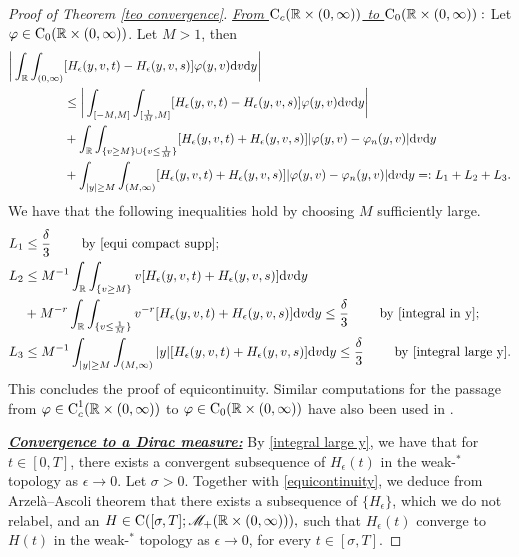 \documentclass[11pt]{article}
\numberwithin{equation}{section}
\newcommand{\der}{\textup{d}}
\begin{document}
\begin{proof}[Proof of Theorem \ref{teo convergence}]
\textit{\underline{From $\textup{C}_{c}(\mathbb{R}\times(0,\infty))$ to  $\textup{C}_{0}(\mathbb{R}\times(0,\infty)):$}} 
Let $\varphi\in\textup{C}_{0}(\mathbb{R}\times(0,\infty))$. Let $M>1$, then 
\begin{align*}
    \bigg|\int_{\mathbb{R}}\int_{(0,\infty)} & [H_{\epsilon}(y,v,t)-H_{\epsilon}(y,v,s)]\varphi(y,v)\der v \der y\bigg|\\
    &\leq \bigg|\int_{[-M,M]}\int_{[\frac{1}{M},M]} [H_{\epsilon}(y,v,t)-H_{\epsilon}(y,v,s)]\varphi(y,v)\der v \der y\bigg|\\
    &+\int_{\mathbb{R}}\int_{\{v\geq M\}\cup \{v\leq\frac{1}{M}\}} [H_{\epsilon}(y,v,t)+H_{\epsilon}(y,v,s)]|\varphi(y,v)-\varphi_{n}(y,v)|\der v \der y\\
     &+\int_{|y|\geq M}\int_{(M,\infty)} [H_{\epsilon}(y,v,t)+H_{\epsilon}(y,v,s)]|\varphi(y,v)-\varphi_{n}(y,v)|\der v \der y=: L_{1}+L_{2}+L_{3}.
\end{align*}
We have that the following inequalities hold by choosing $M$ sufficiently large.
\begin{align*}
    L_{1}&\leq \frac{\delta}{3} \qquad  \textup{ by } \eqref{equi compact supp};\\
    L_{2}&\leq M^{-1}\int_{\mathbb{R}}\int_{\{v\geq M\}} v [H_{\epsilon}(y,v,t)+H_{\epsilon}(y,v,s)]\der v \der y\\
    &+M^{-r}\int_{\mathbb{R}}\int_{\{v\leq\frac{1}{M}\}}v^{-r} [H_{\epsilon}(y,v,t)+H_{\epsilon}(y,v,s)]\der v \der y\leq \frac{\delta}{3} \qquad \textup{ by } \eqref{integral in y};\\
    L_{3}&\leq M^{-1}\int_{|y|\geq M}\int_{(M,\infty)} |y|[H_{\epsilon}(y,v,t)+H_{\epsilon}(y,v,s)]\der v \der y\leq \frac{\delta}{3}  \qquad \textup{ by } \eqref{integral large y}.
\end{align*}
This concludes the proof of equicontinuity. Similar computations for the passage from $\varphi\in\textup{C}^{1}_{c}(\mathbb{R}\times(0,\infty))$ to  $\varphi\in\textup{C}_{0}(\mathbb{R}\times(0,\infty))$ have also been used in \cite{cristianspherical}.


\vspace{0.3cm}

\noindent\underline{\textbf{\textit{Convergence to a Dirac measure:}}} 
 By  \eqref{integral large y}, we have that for $t\in[0,T]$, there exists a convergent subsequence of $H_{\epsilon}(t)$ in the weak-$^{\ast}$ topology as $\epsilon\rightarrow 0$.  Let $\sigma>0$. Together with \eqref{equicontinuity}, we deduce from Arzelà–Ascoli theorem that there exists a subsequence of $\{H_{\epsilon}\}$, which we do not relabel, and an $H\in\textup{C}([\sigma,T];\mathscr{M}_{+}(\mathbb{R}\times(0,\infty))),$ such that $H_{\epsilon}(t)$ converge to $H(t)$ in the weak-$^{\ast}$ topology as $\epsilon\rightarrow 0$, for every $t\in[\sigma,T].$


\end{proof}
\end{document}
